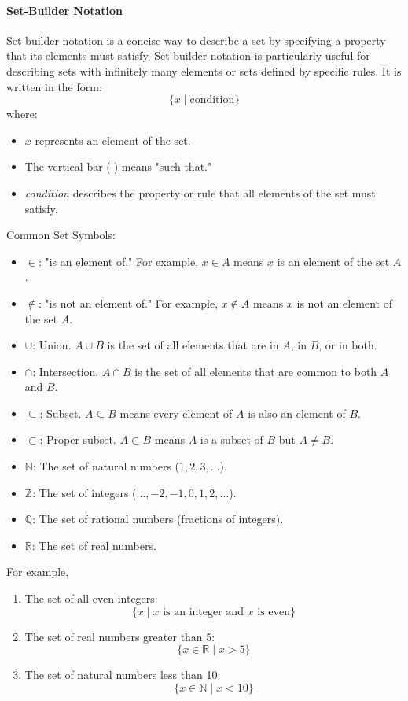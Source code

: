 \documentclass[12pt]{article}
\begin{document}
\paragraph{Set-Builder Notation}
Set-builder notation is a concise way to describe a set by specifying a property that its elements must satisfy. Set-builder notation is particularly useful for describing sets with infinitely many elements or sets defined by specific rules.
It is written in the form:
\[ \{x \mid \text{condition}\} \]
where:
\begin{itemize}
    \item \(x\) represents an element of the set.
    \item The vertical bar (\(\mid\)) means "such that."
    \item \textit{condition} describes the property or rule that all elements of the set must satisfy.
\end{itemize}
Common Set Symbols:
\begin{itemize}
    \item \(\in\): "is an element of." For example, \(x \in A\) means \(x\) is an element of the set \(A\).
    \item \(\notin\): "is not an element of." For example, \(x \notin A\) means \(x\) is not an element of the set \(A\).
    \item \(\cup\): Union. \(A \cup B\) is the set of all elements that are in \(A\), in \(B\), or in both.
    \item \(\cap\): Intersection. \(A \cap B\) is the set of all elements that are common to both \(A\) and \(B\).
    \item \(\subseteq\): Subset. \(A \subseteq B\) means every element of \(A\) is also an element of \(B\).
    \item \(\subset\): Proper subset. \(A \subset B\) means \(A\) is a subset of \(B\) but \(A \neq B\).
    \item \(\mathbb{N}\): The set of natural numbers (\(1, 2, 3, \dots\)).
    \item \(\mathbb{Z}\): The set of integers (\(\dots, -2, -1, 0, 1, 2, \dots\)).
    \item \(\mathbb{Q}\): The set of rational numbers (fractions of integers).
    \item \(\mathbb{R}\): The set of real numbers.
\end{itemize}
For example,
\begin{enumerate}
\item The set of all even integers:
\[ \{x \mid x \text{ is an integer and } x \text{ is even}\} \]
\item The set of real numbers greater than 5:
\[ \{x \in \mathbb{R} \mid x > 5\} \]
\item The set of natural numbers less than 10:
\[ \{x \in \mathbb{N} \mid x < 10\} \]
\end{enumerate}
\end{document}
